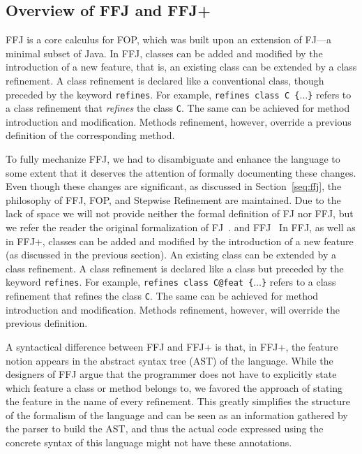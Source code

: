 \subsection{Overview of \ac{FFJ} and \ac{FFJ+}}\label{seq:offj}

\acf{FFJ} is a core calculus for \acf{FOP}, which was built 
upon an extension of \acf{FJ}---a minimal subset of Java. 
In \ac{FFJ}, classes can be added and modified by the 
introduction of a new feature, that is, 
an existing class can be extended by a class refinement. 
A class refinement is declared like a conventional class, though 
preceded by the keyword \texttt{refines}. For example, 
\texttt{refines class C \{$\dots$\}} refers to a class
refinement that
\emph{refines} the class \texttt{C}. The same can be achieved 
for method introduction and modification. Methods refinement,
however, override a previous definition of the corresponding 
method.
 
To fully mechanize \ac{FFJ}, we had to disambiguate and enhance 
the language to some extent that it  deserves the attention of 
formally documenting these changes. 
Even though these changes are significant, as discussed in Section~\ref{seq:ffj}, 
the philosophy of \ac{FFJ}, \ac{FOP}, and Stepwise Refinement are maintained.
Due to the lack of space we will not provide neither the formal definition 
of \ac{FJ} nor \ac{FFJ}, but we refer the reader the original formalization of \ac{FJ}~\cite{igarashi_featherweight_2001}.
 and \ac{FFJ}~\cite{apel_feature_2008}
In \ac{FFJ}, as well as in \ac{FFJ+}, classes can be added and 
modified by the introduction of a new feature (as discussed in the previous section).
An existing class can be extended by a class refinement. A class refinement is declared like a class but
preceded by the keyword \texttt{refines}. For example, \texttt{refines class C@feat \{$\dots$\}} refers to a class refinement that
refines the class \texttt{C}. The same can be achieved for method introduction and modification. Methods refinement,
however, will override the previous definition.

A syntactical difference between \ac{FFJ} and \ac{FFJ+} is that, in \ac{FFJ+}, 
the feature notion appears in the abstract syntax tree (AST) of the language.
While the designers of \ac{FFJ} argue that the programmer does not have 
to explicitly state which feature a class or method belongs to, 
we favored the approach of stating the feature in the name of every refinement.
This greatly simplifies the structure of the formalism of the language and can be 
seen as an information gathered by the parser to build the AST, and thus 
the actual code expressed using the concrete syntax of this language 
might not have these annotations.

